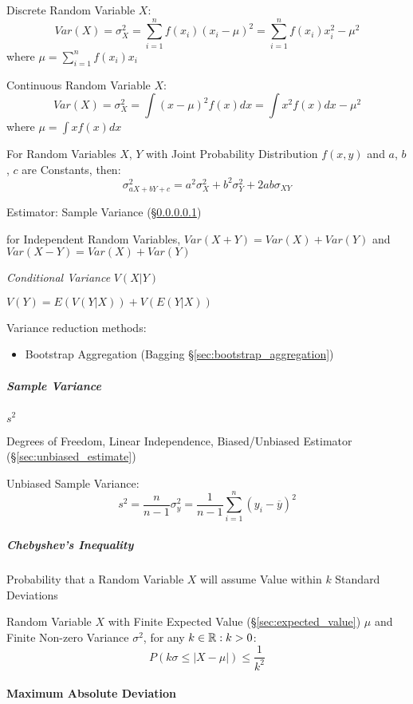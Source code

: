 Discrete Random Variable $X$:
\[
  Var(X) = \sigma_X^2 = \sum_{i=1}^n f(x_i) (x_i - \mu)^2 = \sum_{i=1}^n
  f(x_i) x_i^2 - \mu^2
\]
where $\mu = \sum_{i=1}^n f(x_i) x_i$

Continuous Random Variable $X$:
\[
  Var(X) = \sigma_X^2 = \int (x - \mu)^2 f(x) dx = \int x^2 f(x) dx -
  \mu^2
\]
where $\mu = \int x f(x) dx$

For Random Variables $X$, $Y$ with Joint Probability Distribution
$f(x,y)$ and $a$, $b$, $c$ are Constants, then:
\[
  \sigma^2_{a X + b Y + c} = a^2 \sigma^2_X + b^2 \sigma^2_Y + 2ab
  \sigma_{X Y}
\]

\fist Estimator: Sample Variance (\S\ref{sec:sample_variance})

for Independent Random Variables, $Var(X + Y) = Var(X) + Var(Y)$ and
$Var(X - Y) = Var(X) + Var(Y)$

\emph{Conditional Variance} $V(X|Y)$

$V(Y) = E(V(Y|X)) + V(E(Y|X))$

Variance reduction methods:
\begin{itemize}
  \item Bootstrap Aggregation (Bagging \S\ref{sec:bootstrap_aggregation})
\end{itemize}



\subparagraph{Sample Variance}\label{sec:sample_variance}\hfill

$s^2$

Degrees of Freedom, Linear Independence, Biased/Unbiased Estimator
(\S\ref{sec:unbiased_estimate})

Unbiased Sample Variance:
\[
  s^2 = \frac{n}{n-1}\sigma^2_y =
  \frac{1}{n-1} \sum_{i=1}^n (y_i - \overline{y})^2
\]



\subparagraph{Chebyshev's Inequality}\label{sec:chebyshevs_inequality}\hfill

Probability that a Random Variable $X$ will assume Value within $k$ Standard
Deviations

Random Variable $X$ with Finite Expected Value (\S\ref{sec:expected_value})
$\mu$ and Finite Non-zero Variance $\sigma^2$, for any $k \in \mathbb{R} : k > 0$:
\[
  P(k\sigma \leq |X - \mu|) \leq \frac{1}{k^2}
\]



\paragraph{Maximum Absolute Deviation}
\label{sec:maximum_absolute_deviation}\hfill

